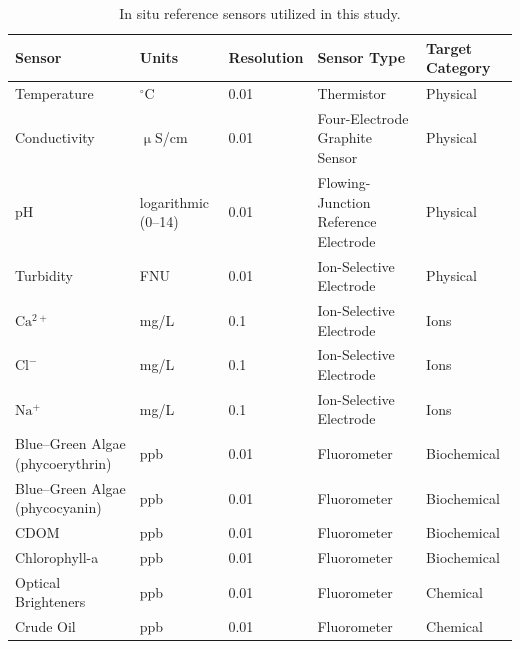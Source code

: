 \documentclass[remotesensing,article,accept,pdftex,moreauthors]{Definitions/mdpi}
\begin{document}
\begin{table}[H] 
\caption{In situ reference sensors utilized in this study.\label{tab:sensors}}
\begin{tabularx}{\textwidth}{CCCCC}
\toprule
\textbf{Sensor}	& \textbf{Units} & \textbf{Resolution} & \textbf{Sensor Type} & \textbf{Target Category}\\
\midrule
Temperature		                    & $^{\circ}$C        & 0.01  & Thermistor                           & Physical \\
Conductivity                        & $\upmu$S/cm          & 0.01  & Four-Electrode Graphite Sensor       & Physical  \\
pH                                  & logarithmic (0--14) & 0.01  & Flowing-Junction Reference Electrode & Physical \\
Turbidity                           & FNU                & 0.01  & Ion-Selective Electrode              & Physical \\
$\mathrm{Ca^{2+}}$                  & mg/L               & 0.1   & Ion-Selective Electrode              & Ions \\
$\mathrm{Cl^-}$                     & mg/L              & 0.1   & Ion-Selective Electrode              & Ions \\
$\mathrm{Na^+}$                     & mg/L          & 0.1   & Ion-Selective Electrode              & Ions \\
Blue--Green Algae (phycoerythrin)    & ppb                & 0.01  & Fluorometer                          & Biochemical \\
Blue--Green Algae (phycocyanin)      & ppb                & 0.01  & Fluorometer                          & Biochemical \\
CDOM                                & ppb                & 0.01  & Fluorometer                          & Biochemical \\
Chlorophyll-a                       & ppb                & 0.01  & Fluorometer                          & Biochemical \\
Optical Brighteners                 & ppb                & 0.01  & Fluorometer                          & Chemical \\
Crude Oil                           & ppb                & 0.01  & Fluorometer                          & Chemical\\
\bottomrule
\end{tabularx}
\end{table}
\end{document}
